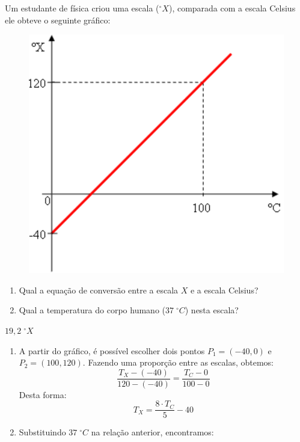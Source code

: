 \begin{exercise}[ID=Q201006, difficulty=medium, type=ER, typequestion=open]
    Um estudante de física criou uma escala ($^\circ X$), comparada com a escala Celsius ele obteve o seguinte gráfico:
    \begin{figure}[ht] 
        \centering
        \includegraphics[scale=0.3]{graph1.pdf}
        \label{fig:graphterm1}
    \end{figure}
    \begin{enumerate}[label=\alph*),nosep]
        \item Qual a equação de conversão entre a escala $X$ e a escala Celsius?
        \item Qual a temperatura do corpo humano ($37\;^\circ C$) nesta escala?
    \end{enumerate}
\end{exercise}
\begin{shortsolution}
	$19,2\;^\circ X$
\end{shortsolution}
\begin{solution}
	\noindent
\begin{enumerate}[label=\alph*),nosep]
	\item A partir do gráfico, é possível escolher dois pontos $P_{1}=(-40,0)$ e $P_{2}=(100,120)$. Fazendo uma proporção entre as escalas, obtemos:
	\[\dfrac{T_{X}-(-40)}{120-(-40)} = \dfrac{T_{C}-0}{100-0}\]
	Desta forma:
	\[\boxed{T_{X}=\dfrac{8 \cdot T_{C}}{5} - 40}\]
	\item Substituindo $37\;^\circ C$ na relação anterior, encontramos: 
\end{enumerate}   
\end{solution}